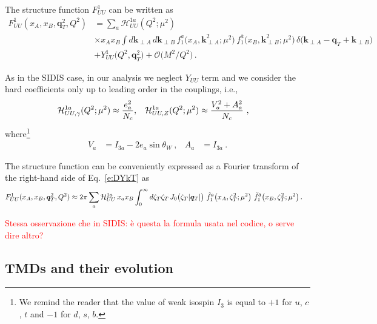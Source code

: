 \documentclass[aps,preprintnumbers,showpacs,nofootinbib,superscriptaddress,floatfix]{revtex4}
\newcommand{\T}{\perp}
\newcommand{\bT}{\zeta_T}
\begin{document}
The structure function $F_{UU}^1$ can be written as
\begin{align}
\label{e:DYkT}
   F_{UU}^1(x_A,x_B, \bm{q}_{T}^2, Q^2) &= \sum_a \mathcal{H}_{UU}^{1 a}(Q^2;\mu^2) \\ 
      &\times x_A x_B \int d\bm{k}_{\T A}^{} \, d\bm{k}_{\T B}^{} 
\,  f_1^a\big(x_A,\bm{k}_{\T A}^2; \mu^2 \big) 
\, f_{1}^{\bar{a}}\big(x_B,\bm{k}_{\T B}^2; \mu^2 \big) \,
      \delta \big({\bm k}_{\T A} - {\bm q}_T + {\bm k}_{\T B}\big)
\nonumber\\&
\nonumber + Y_{UU}^1\big(Q^2, \bm{q}_T^2\big) + \mathcal{O}\big(M^2/Q^2\big) \, .
\end{align} 


As in the SIDIS case, in our analysis we neglect $Y_{UU}$ term
and we consider the hard coefficients only up to leading order in
the couplings, i.e.,
\begin{align} 
{\cal H}_{UU, \gamma}^{1 a}(Q^2;\mu^2) &\approx \frac{e_a^2}{N_c},
&
{\cal H}_{UU, Z}^{1 a}(Q^2;\mu^2) &\approx \frac{V_a^2+A_a^2}{N_c} \ ,
\end{align}  
where\footnote{We remind the reader that the value of weak isospin $I_3$ is equal to $+1$ for $u$, $c$, $t$ and
  $-1$ for $d$, $s$, $b$.}
\begin{align}
V_a & = I_{3a} - 2 e_{a} \sin \theta_W \  ,
&
A_a & = I_{3a} \  .
\end{align} 

The structure function can be conveniently expressed as a Fourier transform of
the right-hand side of Eq.~\eqref{e:DYkT} as 
\begin{align}
\label{e:DYkTFF}
   F_{UU}^1(x_A,x_B, \bm{q}_T^2, Q^2) &\approx
 2\pi \sum_a {\cal H}_{UU}^{1 a} \,x_a x_B \int_0^{\infty} d \bT \bT\, J_0\big( \bT |\bm{q}_T|\big)\ 
      \tilde{f}_1^a\big(x_A, \bT^2;\mu^2\big) \   \tilde{f}_1^{\bar{a}}\big(x_B, \bT^2;\mu^2 \big)  \, .
\end{align} 

\textcolor{red}{ Stessa osservazione che in SIDIS: \`e questa la formula usata nel codice, o serve dire altro?}



\subsection{TMDs and their evolution}
\label{ss:TMDevo}
\end{document}
